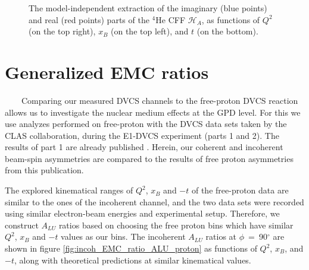 \begin{figure}[h!]
\caption{The model-independent extraction of the imaginary (blue points) and 
real (red points) parts of the $^4$He CFF $\mathcal{H}_A$, as functions of 
$Q^{2}$ (on the top right), $x_B$ (on the top left), and $t$ (on the bottom).}
\label{fig:HA_CFF}
\end{figure}


\section{Generalized EMC ratios}
~~~~Comparing our measured DVCS channels to the free-proton DVCS reaction 
allows us to investigate the nuclear medium effects at the GPD level. For this 
we use analyzes performed on free-proton with the DVCS data sets taken by the CLAS 
collaboration, during the E1-DVCS experiment (parts 1 and 2). The results of 
part 1 are already published \cite{FX_BSA, CLAS_cross_section}. Herein, our 
coherent and incoherent beam-spin asymmetries are compared to the results of
free proton asymmetries from this publication.


The explored kinematical ranges of $Q^2$, $x_{B}$ and $-t$ of the free-proton 
data are similar to the ones of the incoherent channel, and the two data sets 
were recorded using similar electron-beam energies and experimental setup.  
Therefore, we construct $A_{LU}$ ratios based on choosing the free proton bins 
which have similar $Q^2$, $x_{B}$ and $-t$ values as our bins. The incoherent 
$A_{LU}$ ratios at $\phi$~=~90$^{\circ}$ are shown in figure 
\ref{fig:incoh_EMC_ratio_ALU_proton} as functions of $Q^{2}$, $x_{B}$, and 
$-t$, along with theoretical predictions at similar kinematical values.\\
  
